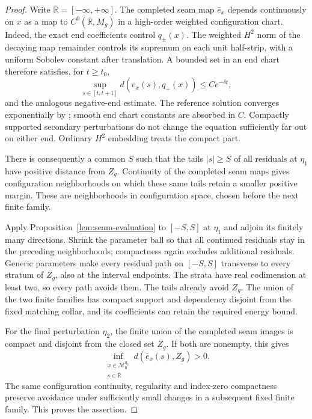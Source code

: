 \documentclass[11pt]{amsart}
\theoremstyle{definition}
\theoremstyle{remark}
\theoremstyle{plain}
\newcommand{\RR}{\mathbb{R}}
\newcommand{\cM}{\mathcal{M}}
\begin{document}
\begin{proof}
Write $\overline{\RR}=[-\infty,+\infty]$. The completed
seam map $\bar e_x$ depends continuously on $x$ as a map
to $C^0(\overline{\RR},M_g)$ in a high-order weighted
configuration chart. Indeed, the exact end coefficients
control $q_\pm(x)$. The weighted $H^2$ norm of the decaying
map remainder controls its supremum on each unit half-strip,
with a uniform Sobolev constant after translation. A bounded
set in an end chart therefore satisfies, for $t\geq t_0$,
\begin{equation}\label{eq:uniform-residual-seam-tail}
 \sup_{s\in[t,t+1]}d(e_x(s),q_+(x))\leq C e^{-\delta t},
\end{equation}
and the analogous negative-end estimate. The reference
solution converges exponentially by
\cite[Proposition~5.29]{DaeFukLip21a}; smooth end chart
constants are absorbed in $C$. Compactly supported secondary
perturbations do not change the equation sufficiently far out
on either end. Ordinary $H^2$ embedding treats the compact part.

There is consequently a common $S$ such that the tails
$|s|\geq S$ of all residuals at $\eta_1$ have positive
distance from $Z_g$. Continuity of the completed seam maps
gives configuration neighborhoods on which these same tails
retain a smaller positive margin. These are neighborhoods in
configuration space, chosen before the next finite family.

Apply Proposition~\ref{lem:seam-evaluation} to $[-S,S]$ at
$\eta_1$ and adjoin its finitely many directions. Shrink the
parameter ball so that all continued residuals stay in the
preceding neighborhoods; compactness again excludes additional
residuals. Generic parameters make every residual path on
$[-S,S]$ transverse to every stratum of $Z_g$, also at the
interval endpoints. The strata have real codimension at least
two, so every path avoids them. The tails already avoid $Z_g$.
The union of the two finite families has compact support and
dependency disjoint from the fixed matching collar, and its
coefficients can retain the required energy bound.

For the final perturbation $\eta_2$, the finite union of the
completed seam images is compact and disjoint from the closed
set $Z_g$. If both are nonempty, this gives
\begin{equation}\label{eq:global-residual-separation}
 \inf_{\substack{x\in\cM^{\eta_2}_0\\
                  s\in\overline{\RR}}}
                  d(\bar e_x(s),Z_g)>0 .
\end{equation}
The same configuration continuity, regularity and index-zero
compactness preserve avoidance under sufficiently small changes
in a subsequent fixed finite family. This proves the assertion.
\end{proof}
\end{document}
